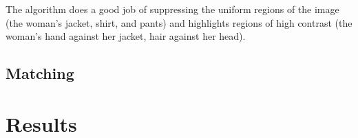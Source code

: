 \documentclass{article}
\begin{document}
\begin{center}
\end{center}
The algorithm does a good job of suppressing the uniform regions of the image (the woman's jacket, shirt, and pants) and highlights regions of high contrast (the woman's hand against her jacket, hair against her head).

\subsection{Matching}

\section{Results}
\end{document}
